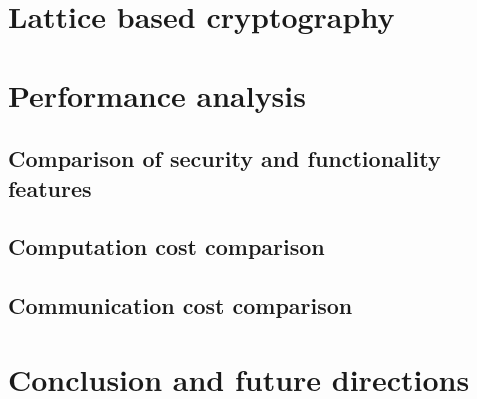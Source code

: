 \documentclass[3p,times,onecolumn]{elsarticle}
\begin{document}
\section{\textbf{Lattice based cryptography  }}

\section{\textbf{Performance analysis}}



\subsection{\textbf{ Comparison of security and functionality features}}


\subsection{\textbf{Computation cost comparison}}


\subsection{\textbf{Communication cost comparison}}





\section{Conclusion and future directions}


\end{document}
